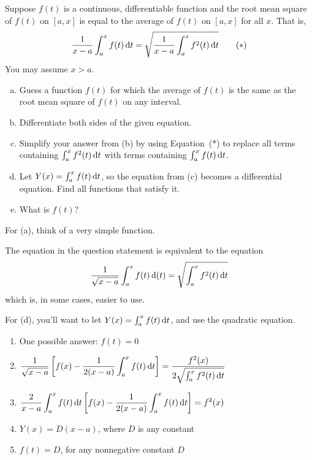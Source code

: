 \begin{question}
Suppose $f(t)$ is a continuous, differentiable function and the root mean square of $f(t)$ on $[a,x]$ is equal to the average of $f(t)$ on $[a,x]$ for all $x$. That is,
\begin{equation}
\frac{1}{x-a}\int_a^xf(t)\,\mathrm{d}t=\sqrt{\frac{1}{x-a}\int_a^x f^2(t)\,\mathrm{d}t}\tag{$*$}
\end{equation}
You may assume $x>a$.

\begin{enumerate}[(a)]
\item Guess a function $f(t)$ for which the average of $f(t)$ is the same as the root mean square of $f(t)$ on any interval.
\item Differentiate both sides of the given equation.
\item Simplify your answer from (b) by using Equation~($*$) to replace all terms containing $\int_a^x f^2(t)\,\mathrm{d}t$ with terms containing $\int_a^x f(t)\,\mathrm{d}t$.
\item Let $Y(x) = \int_a^x f(t)\,\mathrm{d}t$, so the equation from (c) becomes a differential equation. Find all functions that satisfy it.
\item What is $f(t)$?
\end{enumerate}
\end{question}
\begin{hint}
For (a), think of a very simple function.

The equation in the question statement is equivalent to the equation
\[\frac{1}{\sqrt{x-a}}\int_a^xf(t)\,\mathrm{d}(t)=\sqrt{\int_a^x f^2(t)\,\mathrm{d}t}\]
which is, in some cases, easier to use.

For (d), you'll want to let $Y(x)=\int_a^x f(t)\,\mathrm{d}t$, and use the quadratic equation. \end{hint}
\begin{answer}
\begin{enumerate}
\item[(a)] One possible answer: $f(t)=0$
\item[(b)] $\displaystyle \frac{1}{\sqrt{x-a}}\left[f(x) - \frac{1}{2(x-a)}\int_a^x f(t)\,\mathrm{d}t\right]
=\frac{f^2(x)}{2\sqrt{\int_a^xf^2(t)\,\mathrm{d}t}}$
\item[(c)] $\displaystyle \frac{2}{x-a}\int_a^x f(t)\,\mathrm{d}t\left[f(x) - \frac{1}{2(x-a)}\int_a^x f(t)\,\mathrm{d}t\right]=f^2(x)$
\item[(d)] $Y(x) = D(x-a)$, where $D$ is any constant
\item[(e)] $f(t)=D$, for any nonnegative constant $D$
\end{enumerate}
\end{answer}
